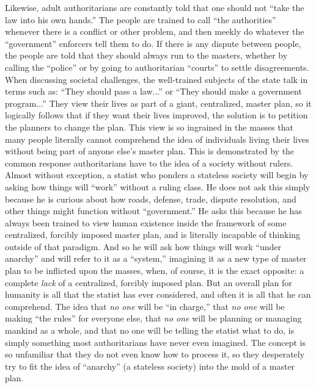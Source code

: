 \documentclass{book}
\begin{document}
Likewise, adult authoritarians are constantly told that one should not \enquote{take the law into his own hands.} The people are trained to call \enquote{the authorities} whenever there is a conflict or other problem, and then meekly do whatever the \enquote{government} enforcers tell them to do. If there is any dispute between people, the people are told that they should always run to the masters, whether by calling the \enquote{police} or by going to authoritarian \enquote{courts} to settle disagreements. When discussing societal challenges, the well-trained subjects of the state talk in terms such as: \enquote{They should pass a law...} or \enquote{They should make a government program...} They view their lives as part of a giant, centralized, master plan, so it logically follows that if they want their lives improved, the solution is to petition the planners to change the plan. This view is so ingrained in the masses that many people literally cannot comprehend the idea of individuals living their lives without being part of anyone else's master plan. This is demonstrated by the common response authoritarians have to the idea of a society without rulers. Almost without exception, a statist who ponders a stateless society will begin by asking how things will \enquote{work} without a ruling class. He does not ask this simply because he is curious about how roads, defense, trade, dispute resolution, and other things might function without \enquote{government.} He asks this because he has always been trained to view human existence inside the framework of some centralized, forcibly imposed master plan, and is literally incapable of thinking outside of that paradigm. And so he will ask how things will work \enquote{under anarchy} and will refer to it as a \enquote{system,} imagining it as a new type of master plan to be inflicted upon the masses, when, of course, it is the exact opposite: a complete \emph{lack} of a centralized, forcibly imposed plan. But an overall plan for humanity is all that the statist has ever considered, and often it is all that he can comprehend. The idea that \emph{no one} will be \enquote{in charge,} that \emph{no one} will be making \enquote{the rules} for everyone else, that \emph{no one} will be planning or managing mankind as a whole, and that no one will be telling the statist what to do, is simply something most authoritarians have never even imagined. The concept is so unfamiliar that they do not even know how to process it, so they desperately try to fit the idea of \enquote{anarchy} (a stateless society) into the mold of a master plan.
\end{document}
